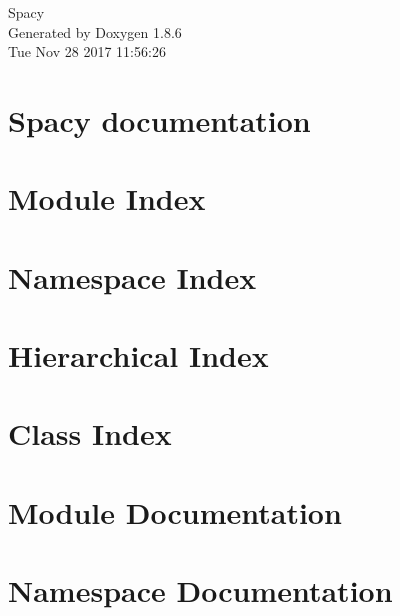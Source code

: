 \documentclass[twoside]{book}
\newcommand{\clearemptydoublepage}{%
  \newpage{\pagestyle{empty}\cleardoublepage}%
}
\begin{document}
\hypersetup{pageanchor=false}
\begin{titlepage}
\vspace*{7cm}
\begin{center}%
{\Large Spacy }\\
\vspace*{1cm}
{\large Generated by Doxygen 1.8.6}\\
\vspace*{0.5cm}
{\small Tue Nov 28 2017 11:56:26}\\
\end{center}
\end{titlepage}
\clearemptydoublepage
\tableofcontents
\clearemptydoublepage
{}
\hypersetup{pageanchor=true}

\chapter{Spacy documentation}
\label{index}\hypertarget{index}{}
\chapter{Module Index}

\chapter{Namespace Index}

\chapter{Hierarchical Index}

\chapter{Class Index}

\chapter{Module Documentation}













\chapter{Namespace Documentation}
















\end{document}
